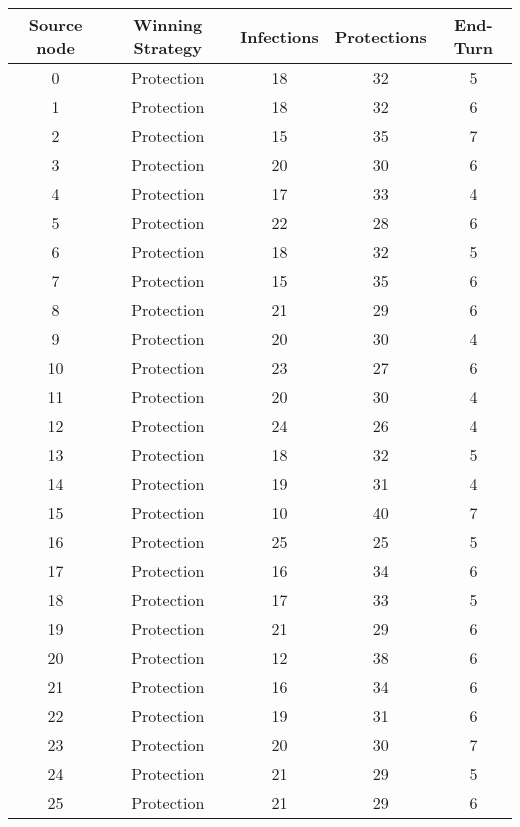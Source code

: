 \documentclass[results.tex]{subfiles}
\begin{document}
\begin{center}
  \begin{tabular}{| c || c | c | c | c |}
    \hline
    {\bfseries Source node} & {\bfseries Winning Strategy} & {\bfseries Infections} & {\bfseries Protections} & {\bfseries End-Turn} \\  %
    \hline\hline
    0 & Protection & 18 & 32 & 5 \\ 
    \hline
    1 & Protection & 18 & 32 & 6 \\ 
    \hline
    2 & Protection & 15 & 35 & 7 \\ 
    \hline
    3 & Protection & 20 & 30 & 6 \\ 
    \hline
    4 & Protection & 17 & 33 & 4 \\ 
    \hline
    5 & Protection & 22 & 28 & 6 \\ 
    \hline
    6 & Protection & 18 & 32 & 5 \\ 
    \hline
    7 & Protection & 15 & 35 & 6 \\ 
    \hline
    8 & Protection & 21 & 29 & 6 \\ 
    \hline
    9 & Protection & 20 & 30 & 4 \\ 
    \hline
    10 & Protection & 23 & 27 & 6 \\ 
    \hline
    11 & Protection & 20 & 30 & 4 \\ 
    \hline
    12 & Protection & 24 & 26 & 4 \\ 
    \hline
    13 & Protection & 18 & 32 & 5 \\ 
    \hline
    14 & Protection & 19 & 31 & 4 \\ 
    \hline
    15 & Protection & 10 & 40 & 7 \\ 
    \hline
    16 & Protection & 25 & 25 & 5 \\ 
    \hline
    17 & Protection & 16 & 34 & 6 \\ 
    \hline
    18 & Protection & 17 & 33 & 5 \\ 
    \hline
    19 & Protection & 21 & 29 & 6 \\ 
    \hline
    20 & Protection & 12 & 38 & 6 \\ 
    \hline
    21 & Protection & 16 & 34 & 6 \\ 
    \hline
    22 & Protection & 19 & 31 & 6 \\ 
    \hline
    23 & Protection & 20 & 30 & 7 \\ 
    \hline
    24 & Protection & 21 & 29 & 5 \\ 
    \hline
    25 & Protection & 21 & 29 & 6 \\ 

\end{tabular}
\end{center}
\end{document}
